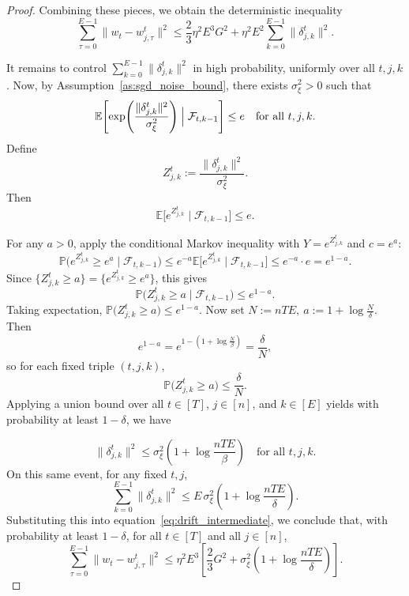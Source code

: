 \documentclass{article} %
\def\eqref#1{equation~\ref{#1}}
\begin{document}
\begin{proof}
Combining these pieces, we obtain the deterministic inequality
\begin{equation}
    \label{eq:drift_intermediate}
    \sum_{\tau=0}^{E-1} \|w_t - w_{j,\tau}^t\|^2
    \le
    \frac{2}{3}\eta^2 E^3 G^2
    +
    \eta^2 E^2 \sum_{k=0}^{E-1}\|\delta_{j,k}^t\|^2.
\end{equation}

It remains to control $\sum_{k=0}^{E-1}\|\delta_{j,k}^t\|^2$ in high probability, uniformly over all $t,j,k$. Now, by Assumption~\ref{as:sgd_noise_bound}, there exists $\sigma_\xi^2>0$ such that
\[
\mathbb{E}\!\left[
    \exp\!\left(\frac{\|\delta_{j,k}^t\|^2}{\sigma_\xi^2}\right)
    \Bigm| \mathcal{F}_{t,k-1}
\right] \le e
\quad
\text{for all } t,j,k.
\]
Define
\[
Z_{j,k}^t := \frac{\|\delta_{j,k}^t\|^2}{\sigma_\xi^2}.
\]
Then
\[
\mathbb{E}\bigl[e^{Z_{j,k}^t} \mid \mathcal{F}_{t,k-1}\bigr] \le e.
\]

For any $a>0$, apply the conditional Markov inequality with $Y = e^{Z_{j,k}^t}$ and $c = e^a$:
\[
\mathbb{P}\bigl(e^{Z_{j,k}^t} \ge e^a \mid \mathcal{F}_{t,k-1}\bigr)
\le e^{-a} \mathbb{E}\bigl[e^{Z_{j,k}^t} \mid \mathcal{F}_{t,k-1}\bigr]
\le e^{-a} \cdot e
= e^{1-a}.
\]
Since $\{Z_{j,k}^t \ge a\} = \{e^{Z_{j,k}^t} \ge e^a\}$, this gives
\[
\mathbb{P}\bigl(Z_{j,k}^t \ge a \mid \mathcal{F}_{t,k-1}\bigr)
\le e^{1-a}.
\]
Taking expectation,
$
\mathbb{P}\bigl(Z_{j,k}^t \ge a\bigr) \le e^{1-a}.
$
Now set
$
N := nTE,
\ 
a := 1 + \log\frac{N}{\delta}.
$
Then
\[
e^{1-a} = e^{1-(1+\log\frac{N}{\beta})}
= \frac{\delta}{N},
\]
so for each fixed triple $(t,j,k)$,
\[
\mathbb{P}\bigl(Z_{j,k}^t \ge a\bigr) \le \frac{\delta}{N}.
\]
Applying a union bound over all $t \in [T]$, $j \in [n]$, and $k \in [E]$ yields with probability at least $1-\delta$, we have

\begin{equation}
\label{eq:unif_prob_grad}
    \|\delta_{j,k}^t\|^2 \le \sigma_\xi^2 \left(1 + \log\frac{nTE}{\beta}\right)
 \quad\text{for all } t,j,k.
\end{equation}
On this same event, for any fixed $t,j$,
\[
\sum_{k=0}^{E-1}\|\delta_{j,k}^t\|^2
\le E \,\sigma_\xi^2 \left(1 + \log\frac{nTE}{\delta}\right).
\]
Substituting this into \eqref{eq:drift_intermediate}, we conclude that, with probability at least $1-\delta$, for all $t \in [T]$ and all $j \in [n]$,
\[
\sum_{\tau=0}^{E-1} \|w_t - w_{j,\tau}^t\|^2
\le
\eta^2 E^3\left[
\frac{2}{3}G^2 + \sigma_\xi^2\left(1 + \log\frac{nTE}{\delta}\right)
\right].
\]
\end{proof}
\end{document}
